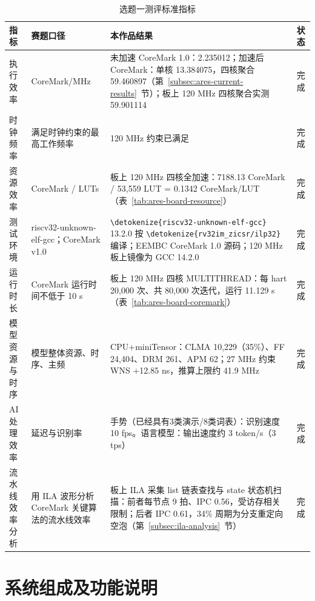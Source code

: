 \documentclass[UTF8,a4paper,12pt,fontset=none,scheme=plain]{ctexart}
\newcommand{\code}[1]{\texttt{\detokenize{#1}}}
\newenvironment{tighttable}{\begingroup\setstretch{1}\fontsize{9}{12}\selectfont\setlength{\tabcolsep}{2pt}}{\endgroup}
\renewcommand{\code}[1]{{\small\ttfamily\urlstyle{tt}\expandafter\nolinkurl\expandafter{\detokenize{#1}}}}
\begin{document}
\begin{table}[H]
\centering
\caption{选题一测评标准指标}
\label{tab:task-metrics}
\begin{tighttable}
\begin{tabularx}{\linewidth}{@{}P{2.3cm}P{3.0cm}XC{1.4cm}@{}}
\toprule
指标 & 赛题口径 & 本作品结果 & 状态 \\
\midrule
执行效率 & CoreMark/MHz & 未加速 CoreMark 1.0：2.235012；加速后 CoreMark：单核 13.384075，四核聚合 59.460897（第~\ref{subsec:ares-current-results}~节）；板上 120 MHz 四核聚合实测 59.901114 & 完成 \\
时钟频率 & 满足时钟约束的最高工作频率 & 120 MHz 约束已满足 & 完成 \\
资源效率 & CoreMark / LUTs & 板上 120 MHz 四核全加速：7188.13 CoreMark / 53,559 LUT = 0.1342 CoreMark/LUT（表~\ref{tab:ares-board-resource}） & 完成 \\
测试环境 & riscv32-unknown-elf-gcc；CoreMark v1.0 & \code{riscv32-unknown-elf-gcc} 13.2.0 按 \code{rv32im_zicsr/ilp32} 编译；EEMBC CoreMark 1.0 源码；120 MHz 板上镜像为 GCC 14.2.0 & 完成 \\
运行时长 & CoreMark 运行时间不低于 10 s & 板上 120 MHz 四核 MULTITHREAD：每 hart 20,000 次、共 80,000 次迭代，运行 11.129 s（表~\ref{tab:ares-board-coremark}） & 完成 \\
模型资源与时序 & 模型整体资源、时序、主频 & CPU+miniTensor：CLMA 10,229（35\%）、FF 24,404、DRM 261、APM 62；27 MHz 约束 WNS +12.85 ns，推算上限约 41.9 MHz & 完成 \\
AI 处理效率 & 延迟与识别率 & 手势（已经具有3类演示/8类词表）：识别速度 10 fps。语言模型：输出速度约 3 token/s（3 tps） & 完成 \\
流水线效率分析 & 用 ILA 波形分析 CoreMark 关键算法的流水线效率 & 板上 ILA 采集 list 链表查找与 state 状态机扫描：前者每节点 9 拍、IPC 0.56，受访存相关限制；后者 IPC 0.61，34\% 周期为分支重定向空泡（第~\ref{subsec:ila-analysis}~节） & 完成 \\
\bottomrule
\end{tabularx}
\end{tighttable}
\end{table}

\clearpage
\section{系统组成及功能说明}
\end{document}
